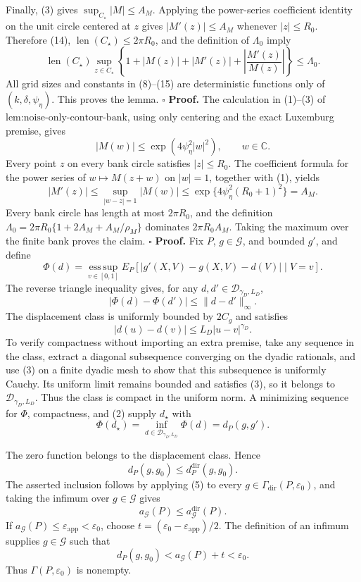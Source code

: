 Finally, (3) gives \(\sup_{C_\star}|M|\le A_M\).  Applying the power-series coefficient identity on the unit circle centered at \(z\) gives \(|M'(z)|\le A_M\) whenever \(|z|\le R_0\).  Therefore (14), \(\operatorname{len}(C_\star)\le2\pi R_0\), and the definition of \(\Lambda_0\) imply
\[
 \operatorname{len}(C_\star)\sup_{z\in C_\star}
 \left\{1+|M(z)|+|M'(z)|+\left|\frac{M'(z)}{M(z)}\right|\right\}
 \le\Lambda_0. \tag{15}
\]
All grid sizes and constants in (8)--(15) are deterministic functions only of \((k,\delta,\psi_\eta)\).  This proves the lemma. \(\square\)
\textbf{Proof.}
The calculation in (1)--(3) of \(\text{lem:noise-only-contour-bank}\), using only centering and the exact Luxemburg premise, gives
\[
 |M(w)|\le\exp(4\psi_\eta^2|w|^2),
 \qquad w\in\mathbb C. \tag{1}
\]
Every point \(z\) on every bank circle satisfies \(|z|\le R_0\).  The coefficient formula for the power series of \(w\mapsto M(z+w)\) on \(|w|=1\), together with (1), yields
\[
 |M'(z)|\le
 \sup_{|w-z|=1}|M(w)|
 \le\exp\{4\psi_\eta^2(R_0+1)^2\}=A_M. \tag{2}
\]
Every bank circle has length at most \(2\pi R_0\), and the definition
\(\Lambda_0=2\pi R_0\{1+2A_M+A_M/\rho_M\}\) dominates \(2\pi R_0A_M\).  Taking the maximum over the finite bank proves the claim. \(\square\)
\textbf{Proof.}
Fix \(P\), \(g\in\mathcal G\), and bounded \(g'\), and define
\[
 \Phi(d)=\operatorname*{ess\,sup}_{v\in[0,1]}
 E_P\!\left[|g'(X,V)-g(X,V)-d(V)|\mid V=v\right]. \tag{1}
\]
The reverse triangle inequality gives, for any \(d,d'\in\mathcal D_{\gamma_D,L_D}\),
\[
 |\Phi(d)-\Phi(d')|\le\|d-d'\|_\infty. \tag{2}
\]
The displacement class is uniformly bounded by \(2C_g\) and satisfies
\[
 |d(u)-d(v)|\le L_D|u-v|^{\gamma_D}. \tag{3}
\]
To verify compactness without importing an extra premise, take any sequence in the class, extract a diagonal subsequence converging on the dyadic rationals, and use (3) on a finite dyadic mesh to show that this subsequence is uniformly Cauchy.  Its uniform limit remains bounded and satisfies (3), so it belongs to \(\mathcal D_{\gamma_D,L_D}\).  Thus the class is compact in the uniform norm.  A minimizing sequence for \(\Phi\), compactness, and (2) supply \(d_\star\) with
\[
 \Phi(d_\star)=\inf_{d\in\mathcal D_{\gamma_D,L_D}}\Phi(d)=d_P(g,g'). \tag{4}
\]

The zero function belongs to the displacement class.  Hence
\[
 d_P(g,g_0)\le d_P^{\mathrm{dir}}(g,g_0). \tag{5}
\]
The asserted inclusion follows by applying (5) to every \(g\in\Gamma_{\mathrm{dir}}(P,\varepsilon_0)\), and taking the infimum over \(g\in\mathcal G\) gives
\[
 a_{\mathcal G}(P)\le a_{\mathcal G}^{\mathrm{dir}}(P). \tag{6}
\]
If \(a_{\mathcal G}(P)\le\varepsilon_{\mathrm{app}}<\varepsilon_0\), choose
\(t=(\varepsilon_0-\varepsilon_{\mathrm{app}})/2\).  The definition of an infimum supplies \(g\in\mathcal G\) such that
\[
 d_P(g,g_0)<a_{\mathcal G}(P)+t<\varepsilon_0. \tag{7}
\]
Thus \(\Gamma(P,\varepsilon_0)\) is nonempty.

